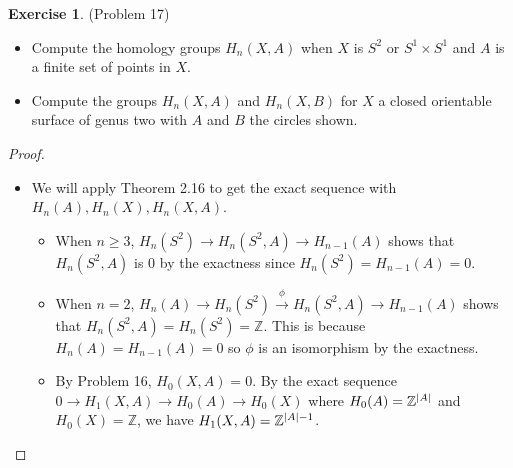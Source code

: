 \documentclass[12pt, psamsfonts]{amsart}
\theoremstyle{definition}
\newtheorem*{exer}{Exercise}
\theoremstyle{remark}
\numberwithin{equation}{section}
\begin{document}
\begin{exer}{(Problem 17)}
  $ $
  \begin{itemize}
    \item
      Compute the homology groups $H_n(X, A)$ when $X$ is $S^2$ or $S^1 \times S^1$ and $A$ is a finite set of points in $X$.
    \item
      Compute the groups $H_n(X, A)$ and $H_n(X, B)$ for $X$ a closed orientable surface of genus two with $A$ and $B$ the circles shown.
  \end{itemize}
\end{exer}

\begin{proof}
  $ $
  \begin{itemize}
    \item
      We will apply Theorem 2.16 to get the exact sequence with $H_n(A), H_n(X), H_n(X, A)$.
      \begin{itemize}
        \item
          When $n \geq 3$, $H_n(S^2) \rightarrow H_n(S^2, A) \rightarrow H_{n - 1}(A)$ shows that $H_n(S^2, A)$ is 0 by the exactness since $H_n(S^2) = H_{n - 1}(A) = 0$.
        \item
          When $n = 2$, $H_n(A) \rightarrow H_n(S^2) \xrightarrow{\phi} H_n(S^2, A) \rightarrow H_{n - 1}(A)$ shows that $H_n(S^2, A) = H_n(S^2) = \mathbb{Z}$.
          This is because $H_n(A) = H_{n - 1}(A) = 0$ so $\phi$ is an isomorphism by the exactness.
        \item
          By Problem 16, $H_0(X, A) = 0$.
          By the exact sequence $0 \rightarrow H_1(X, A) \rightarrow H_0(A) \rightarrow H_0(X)$ where $H_0(A) = \mathbb{Z}^{\abs{A}}$ and $H_0(X) = \mathbb{Z}$, we have $H_1(X, A) = \mathbb{Z}^{\abs{A} - 1}$.
      \end{itemize}


\end{itemize}
\end{proof}
\end{document}
